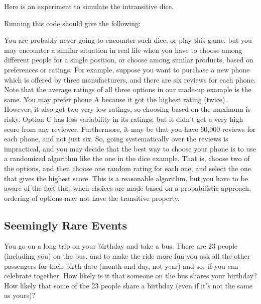 Here is an experiment to simulate the intransitive dice.

Running this code should give the following:


You are probably never going to encounter such dice, or play this game, but you
may encounter a similar situation in real life when you have to choose among
different people for a single position, or choose among similar products, based
on preferences or ratings.  For example, suppose you want to purchase a new
phone which is offered by three
manufacturers, and there are six reviews for each phone. Note that the average
ratings of all three options in our made-up example is the same. You may prefer
phone A because it got the highest rating (twice). However, it also got two
very low ratings, so choosing based on the maximum is risky. Option C has less
variability in its ratings, but it didn't get a very high score from any
reviewer. Furthermore, it may be that you have 60,000 reviews for each phone,
and not just six. So, going systematically over the reviews is impractical, and
you may decide that the best way to choose your phone is to use a randomized
algorithm like the one in the dice example. That is, choose two of the options,
and  then choose one random rating for each one, and select the one that gives
the highest score. This is a reasonable algorithm, but you have to be aware of
the fact that when choices are made based on a probabilistic approach, ordering
of options may not have the transitive property.



\subsection{Seemingly Rare Events}\label{sec:birthday-problem}

\begin{example}\label{exam:birthday}
You go on a long trip on your birthday and take a bus. There are 23 people (including you) on
the bus, and to make the ride more fun you ask all the other passengers for
their birth date (month and day, not year) and see if you can celebrate
together. How likely is it that someone on the bus shares your birthday? How
likely that some of the 23 people share a birthday (even
if it's not the same as yours)?
\end{example}

